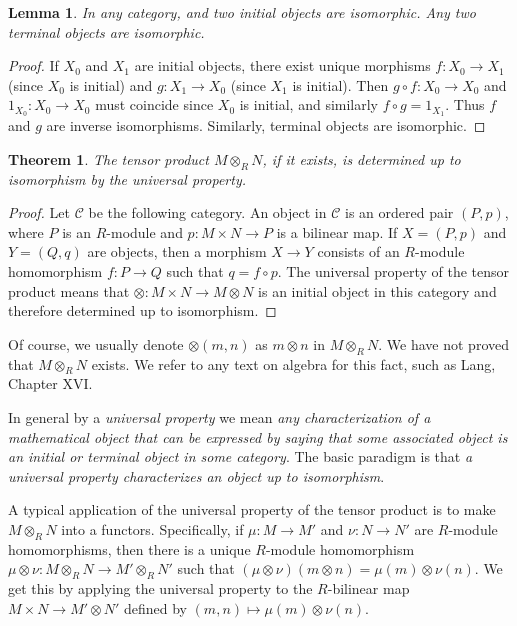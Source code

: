 \documentclass[12pt,reqno]{book}%
\newtheorem{theorem}{Theorem}[chapter]
\newtheorem{lemma}{Lemma}[chapter]
\theoremstyle{definition}
\theoremstyle{remark}
\theoremstyle{theorem}
\theoremstyle{remark}
\begin{document}
\begin{lemma}\label{lem9.1}%
    In any category, and two initial objects are isomorphic.
    Any two terminal objects are isomorphic.
\end{lemma}%
\begin{proof}%
    If $X_0$ and $X_1$ are initial objects, there exist unique morphisms $f : X_0 \to X_1$ (since $X_0$ is initial) and $g : X_1 \to X_0$ (since $X_1$ is initial).
    Then $g \circ f : X_0 \to X_0$ and $1_{X_0} : X_0 \to X_0$ must coincide since $X_0$ is initial, and similarly $f \circ g = 1_{X_1}$.
    Thus $f$ and $g$ are inverse isomorphisms.
    Similarly, terminal objects are isomorphic.
\end{proof}%

\begin{theorem}\label{thm9.1}%
    The tensor product $M \otimes_R N$, if it exists, is determined up to isomorphism by the universal property.
\end{theorem}%
\begin{proof}%
    Let $\mathcal{C}$ be the following category.
    An object in $\mathcal{C}$ is an ordered pair $(P, p)$, where $P$ is an $R$-module and $p : M \times N \to P$ is a bilinear map.
    If $X = (P, p)$ and $Y = (Q, q)$ are objects, then a morphism $X \to Y$ consists of an $R$-module homomorphism $f : P \to Q$ such that $q = f \circ p$.
    The universal property of the tensor product means that $\otimes : M \times N \to M \otimes N$ is an initial object in this category and therefore determined up to isomorphism.
\end{proof}%

Of course, we usually denote $\otimes(m, n)$ as $m \otimes n$ in $M \otimes_R N$.
We have not proved that $M \otimes_R N$ exists.
We refer to any text on algebra for this fact, such as Lang, Chapter XVI.

In general by a \emph{universal property} we mean \emph{any characterization of a mathematical object that can be expressed by saying that some associated object is an initial or terminal object in some category}.
The basic paradigm is that \emph{a universal property characterizes an object up to isomorphism}.

A typical application of the universal property of the tensor product is to make $M \otimes_R N$ into a functors.
Specifically, if $\mu : M \to M'$ and $\nu : N \to N'$ are $R$-module homomorphisms, then there is a unique $R$-module homomorphism $\mu \otimes \nu : M \otimes_R N \to M' \otimes_R N'$ such that $(\mu \otimes \nu)(m \otimes n) = \mu(m) \otimes \nu(n)$.
We get this by applying the universal property to the $R$-bilinear map $M \times N \to M' \otimes N'$ defined by $(m, n) \mapsto \mu(m) \otimes \nu(n)$.
\end{document}

